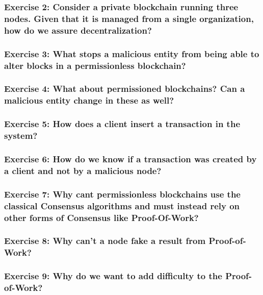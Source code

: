 \documentclass[12pt,a4paper]{article}
\theoremstyle{definition}
\begin{document}
\subsubsection*{Exercise 2: Consider a private blockchain running three nodes. Given that it is managed from a single organization, how do we assure decentralization?}

\subsubsection*{Exercise 3: What stops a malicious entity from being able to alter blocks in a permissionless blockchain?}

\subsubsection*{Exercise 4: What about permissioned blockchains? Can a malicious entity change in these as well?}

\subsubsection*{Exercise 5: How does a client insert a transaction in the system?
}

\subsubsection*{Exercise 6: How do we know if a transaction was created by a client and not by a malicious node?}


\subsubsection*{Exercise 7: Why cant permissionless blockchains use the classical Consensus algorithms and must instead rely on other forms of Consensus like Proof-Of-Work?}

\subsubsection*{Exercise 8: Why can't a node fake a result from Proof-of-Work?}

\subsubsection*{Exercise 9: Why do we want to add difficulty to the Proof-of-Work?}
\end{document}
